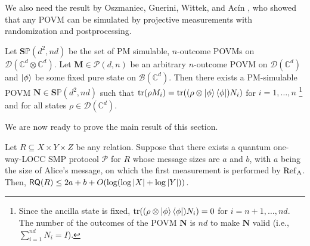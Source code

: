 We also need the result by Oszmaniec, Guerini, Wittek, and Ac{\'i}n \cite{OGWA17}, who showed that any POVM can be simulated by projective measurements with randomization and postprocessing.

\begin{lemma}\label{lem:OGWA17}
    Let $\mathbf{S}\mathbb{P}(d^2,nd)$ be the set of PM simulable, $n$-outcome POVMs on $\mathcal{D}(\mathbb{C}^d \otimes \mathbb{C}^d)$. Let $\mathbf{M} \in \mathcal{P}(d,n)$ be an arbitrary $n$-outcome POVM on $\mathcal{D}(\mathbb{C}^d)$ and $\ket{\phi}$ be some fixed pure state on $\mathcal{B}(\mathbb{C}^d)$. Then there exists a PM-simulable POVM $\mathbf{N} \in \mathbf{S}\mathbb{P}(d^2,nd)$ such that $\mathrm{tr}(\rho M_i) = \mathrm{tr}((\rho \otimes \ket{\phi} \bra{\phi}) N_i)$ for $i=1,\ldots,n$ \footnote{Since the ancilla state is fixed, $\mathrm{tr}((\rho \otimes \ket{\phi} \bra{\phi}) N_i)=0$ for $i=n+1,\ldots,nd$. The number of the outcomes of the POVM $\mathbf{N}$ is $nd$ to make $\mathbf{N}$ valid (i.e., $\sum_{i=1}^{nd} N_i = I$).} and for all states $\rho \in \mathcal{D}(\mathbb{C}^d)$.
\end{lemma}

We are now ready to prove the main result of this section.

\begin{theorem}\label{thm:one-way_LOCC}
    Let $R \subseteq X \times Y \times Z$ be any relation. Suppose that there exists a quantum one-way-LOCC SMP protocol $\mathcal{P}$ for $R$ whose message sizes are $a$ and $b$, with $a$ being the size of Alice's message, on which the first measurement is performed by $\rm{Ref}_A$. Then, $\mathsf{R}\mathsf{Q}(R) \leq 2a + b + O(\log (\log |X| + \log |Y|))$.
\end{theorem}

